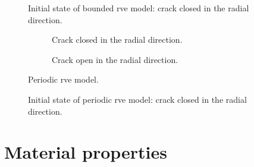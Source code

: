 \documentclass[a4paper, twoside,12pt, abstract]{scrartcl} %
\begin{document}
\begin{figure}[!h]
\centering
  \caption{Initial state of bounded \acrshort{rve} model: crack closed in the radial direction.}
  \label{fig:boundedRVE_onlycc}
\end{figure}

\begin{figure}
\centering
    \begin{subfigure}[b]{0.45\textwidth}
        \caption{Crack closed in the radial direction.}
        \label{fig:periodicRVE_cc}
    \end{subfigure}
\quad
 \begin{subfigure}[b]{0.45\textwidth}
        
        \caption{Crack open in the radial direction.}
        \label{fig:periodicRVE_oc}
    \end{subfigure}
  \caption{Periodic \acrshort{rve} model.}
  \label{fig:periodicRVE_ccoc}
\end{figure}

\begin{figure}[!h]
\centering
  \caption{Initial state of periodic \acrshort{rve} model: crack closed in the radial direction.}
  \label{fig:periodicRVE_onlycc}
\end{figure}


\clearscrheadings
\pagestyle{scrheadings}
\manualmark
\ofoot{\\\pagemark} %
\ifoot{} %
\setheadtopline{2pt}
\setheadsepline{0.5pt}
\setfootsepline{0.5pt}

\section{Material properties}






\clearscrheadings
\pagestyle{scrheadings}
\manualmark
\ofoot{\\\pagemark} %
\ifoot{} %
\setheadtopline{2pt}
\setheadsepline{0.5pt}
\setfootsepline{0.5pt}
\end{document}
